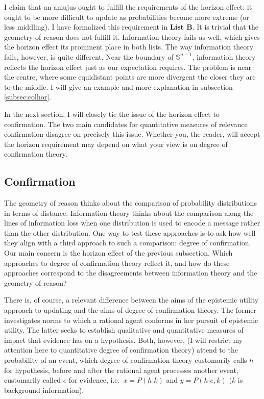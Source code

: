 \documentclass[11pt]{article}
\begin{document}
I claim that an amujus ought to fulfill the requirements of the
horizon effect: it ought to be more difficult to update as
probabilities become more extreme (or less middling). I have
formalized this requirement in \textbf{List B}. It is trivial that the
geometry of reason does not fulfill it. Information theory fails as
well, which gives the horizon effect its prominent place in both
lists. The way information theory fails, however, is quite different.
Near the boundary of $\mathbb{S}^{n-1}$, information theory reflects
the horizon effect just as our expectation requires. The problem is
near the centre, where some equidistant points are more divergent the
closer they are to the middle. I will give an example and more
explanation in subsection \ref{subsec:colhor}.

In the next section, I will closely tie the issue of the horizon
effect to confirmation. The two main candidates for quantitative
measures of relevance confirmation disagree on precisely this issue.
Whether you, the reader, will accept the horizon requirement may
depend on what your view is on degree of confirmation theory.

\subsection{Confirmation}
\label{Confirmation}

The geometry of reason thinks about the comparison of probability
distributions in terms of distance. Information theory thinks about
the comparison along the lines of information loss when one
distribution is used to encode a message rather than the other
distribution. One way to test these approaches is to ask how well they
align with a third approach to such a comparison: degree of
confirmation. Our main concern is the horizon effect of the previous
subsection. Which approaches to degree of confirmation theory reflect
it, and how do these approaches correspond to the disagreements
between information theory and the geometry of reason?

There is, of course, a relevant difference between the aims of the
epistemic utility approach to updating and the aims of degree of
confirmation theory. The former investigates norms to which a rational
agent conforms in her pursuit of epistemic utility. The latter seeks to
establish qualitative and quantitative measures of impact that
evidence has on a hypothesis. Both, however, (I will restrict my
attention here to quantitative degree of confirmation theory) attend
to the probability of an event, which degree of confirmation theory
customarily calls $h$ for hypothesis, before and after the rational
agent processes another event, customarily called $e$ for evidence,
i.e.\ $x=P(h|k)$ and $y=P(h|e,k)$ ($k$ is background information).
\end{document}
